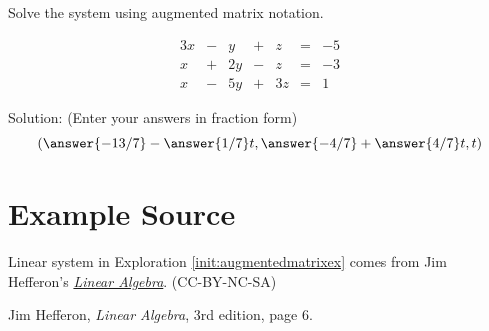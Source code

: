 \documentclass{ximera}
\begin{document}
\begin{problem}\label{prob:sys20solvesys2}
Solve the system using augmented matrix notation.

$$\begin{array}{ccccccc}
      3x & -&y&+&z&= &-5 \\
	 x& +&2y&-&z&=&-3\\
     x& -&5y&+&3z&=&1
    \end{array}$$
    
    Solution: (Enter your answers in fraction form)
    $$\left(\answer{-13/7}-\answer{1/7}t, \answer{-4/7}+\answer{4/7}t, t\right)$$
\end{problem}


\section*{Example Source} 

Linear system in Exploration \ref{init:augmentedmatrixex} comes from Jim Hefferon's \href{http://joshua.smcvt.edu/linearalgebra/#current_version}{\it Linear Algebra}. (CC-BY-NC-SA)

Jim Hefferon, {\it Linear Algebra}, 3rd edition, page 6.
\end{document}
